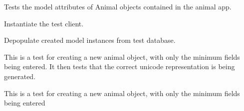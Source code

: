 \documentclass[letterpaper,10pt,english]{sphinxmanual}
\begin{document}
\begin{fulllineitems}
\label{animals:mousedb.animal.tests.AnimalModelTests}
Tests the model attributes of Animal objects contained in the animal app.

\begin{fulllineitems}
\label{animals:mousedb.animal.tests.AnimalModelTests.setUp}
Instantiate the test client.

\end{fulllineitems}


\begin{fulllineitems}
\label{animals:mousedb.animal.tests.AnimalModelTests.tearDown}
Depopulate created model instances from test database.

\end{fulllineitems}


\begin{fulllineitems}
\label{animals:mousedb.animal.tests.AnimalModelTests.test_animal_unicode}
This is a test for creating a new animal object, with only the minimum fields being entered.  It then tests that the correct unicode representation is being generated.

\end{fulllineitems}


\begin{fulllineitems}
\label{animals:mousedb.animal.tests.AnimalModelTests.test_create_animal_minimal}
This is a test for creating a new animal object, with only the minimum fields being entered

\end{fulllineitems}


\end{fulllineitems}

\end{document}

